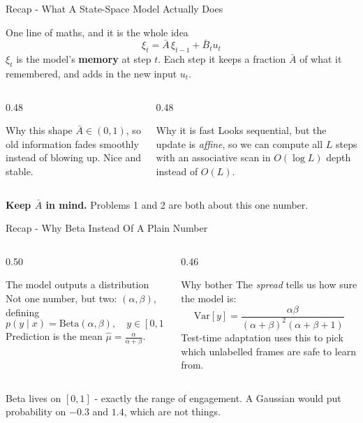 \documentclass[aspectratio=169]{beamer}
\newcommand{\hl}[1]{\textcolor{coolpurple}{\textbf{#1}}}
\begin{document}
	\begin{frame}{Recap - What A State-Space Model Actually Does}
		\begin{block}{One line of maths, and it is the whole idea}
			$$ \xi_t = \bar{A}\,\xi_{t-1} + \bar{B}_t u_t $$
			\small
			$\xi_t$ is the model's \hl{memory} at step $t$. Each step it keeps a fraction
			$\bar{A}$ of what it remembered, and adds in the new input $u_t$.
		\end{block}
		\vspace{0.3em}
		\begin{columns}[onlytextwidth]
			\begin{column}{0.48\textwidth}
				\begin{block}{Why this shape}
					\small
					$\bar{A} \in (0,1)$, so old information fades smoothly instead of
					blowing up. Nice and stable.
				\end{block}
			\end{column}
			\begin{column}{0.48\textwidth}
				\begin{block}{Why it is fast}
					\small
					Looks sequential, but the update is \emph{affine}, so we can compute all
					$L$ steps with an associative scan in $O(\log L)$ depth instead of $O(L)$.
				\end{block}
			\end{column}
		\end{columns}
		\vspace{0.4em}
		\centering\small
		\hl{Keep $\bar{A}$ in mind.} Problems 1 and 2 are both about this one number.
	\end{frame}

	\begin{frame}{Recap - Why Beta Instead Of A Plain Number}
		\begin{columns}[onlytextwidth]
			\begin{column}{0.50\textwidth}
				\begin{block}{The model outputs a distribution}
					\small
					Not one number, but two: $(\alpha, \beta)$, defining
					$$ p(y \mid x) = \mathrm{Beta}(\alpha, \beta), \quad y \in [0,1] $$
					Prediction is the mean $\hat{\mu} = \frac{\alpha}{\alpha+\beta}$.
				\end{block}
			\end{column}
			\begin{column}{0.46\textwidth}
				\begin{block}{Why bother}
					\small
					The \emph{spread} tells us how sure the model is:
					$$ \mathrm{Var}[y] = \frac{\alpha\beta}{(\alpha+\beta)^2(\alpha+\beta+1)} $$
					Test-time adaptation uses this to pick which unlabelled frames are safe
					to learn from.
				\end{block}
			\end{column}
		\end{columns}
		\vspace{0.5em}
		\centering\small
		Beta lives on $[0,1]$ - exactly the range of engagement. A Gaussian would put
		probability on $-0.3$ and $1.4$, which are not things.
	\end{frame}
\end{document}
